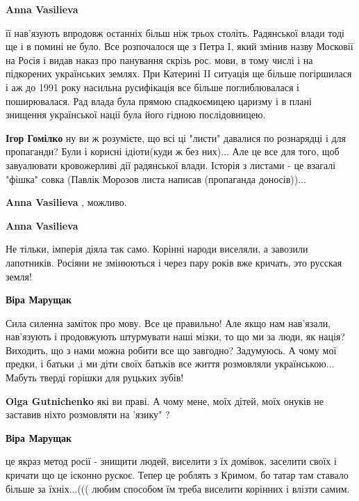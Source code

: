 \begin{itemize}
\begin{itemize}
\begin{itemize}
\textbf{Anna Vasilieva} 

її нав'язують впродовж останніх більш ніж трьох століть. Радянської влади тоді
ще і в помині не було. Все розпочалося ще з Петра I, який змінив назву Московії
на Росія і видав наказ про панування скрізь рос. мови, в тому числі і на
підкорених українських землях. При Катерині II ситуація ще більше погіршилася і
аж до 1991 року насильна русифікація все більше поглиблювалася і поширювалася.
Рад влада була прямою спадкоємицею царизму і в плані знищення української нації
була його гідною послідовницею.

\textbf{Ігор Гомілко} ну ви ж розумієте, що всі ці "листи" давалися по рознарядці і для пропаганди?
Були і корисні ідіоти(куди ж без них)... Але це все для того, щоб завуалювати кровожерливі дії радянської влади. Історія з листами - це взагалі "фішка" совка (Павлік Морозов листа написав (пропаганда доносів))...

\textbf{Anna Vasilieva} , можливо.

\textbf{Anna Vasilieva} 

Не тільки, імперія діяла так само. Корінні народи виселяли, а завозили
лапотників. Росіяни не змінюються і через пару років вже кричать, это русская
земля!


\end{itemize} %

\textbf{Віра Марущак} 

Сила силенна заміток про мову. Все це правильно! Але якщо нам
нав'язали, нав'язують і продовжують штурмувати наші мізки, то що ми за люди, як
нація? Виходить, що з нами можна робити все що завгодно? Задумуюсь. А чому мої
предки, і батьки ,і ми діти своїх батьків все життя розмовляли
українською... Мабуть тверді горішки для руцьких зубів!

\begin{itemize} %
\textbf{Olga Gutnichenko} які ви праві. А чому мене, моїх дітей, моїх онуків не заставив ніхто розмовляти на 'язику" ?
\end{itemize} %

\textbf{Віра Марущак} 

це якраз метод росії - знищити людей, виселити з їх домівок, заселити своїх і
кричати що це ісконно рускоє. Тепер це роблять з Кримом, бо татар там ставало
більше за їхніх...((( любим способом їм треба виселити корінних і влізти самим.



\end{itemize}
\end{itemize}
